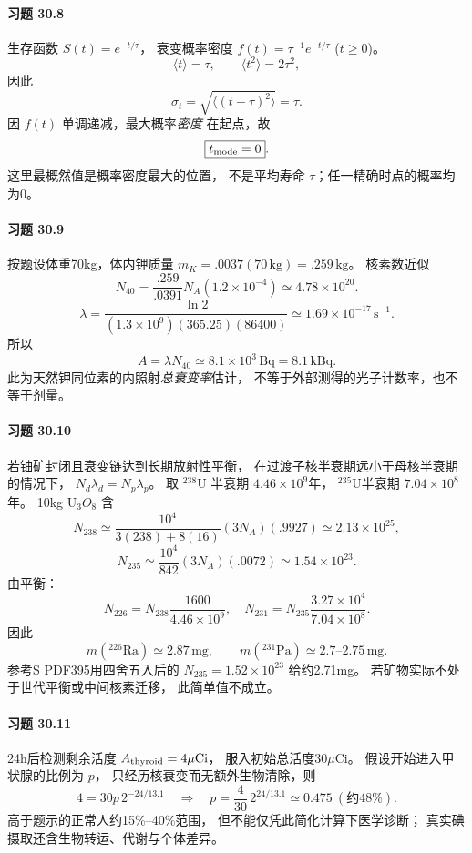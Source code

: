 \paragraph{习题 30.8}
生存函数 \(S(t)=e^{-t/\tau}\)，
衰变概率密度
\(f(t)=\tau^{-1}e^{-t/\tau}\) (\(t\ge0\))。
\[
\langle t\rangle=\tau,\qquad
\langle t^2\rangle=2\tau^2,
\]
因此
\[
\boxed{\sigma_t=\sqrt{\langle(t-\tau)^2\rangle}
=\tau}.
\]
因 \(f(t)\) 单调递减，最大概率\emph{密度}
在起点，故
\[
\boxed{t_{\rm mode}=0}.
\]
这里最概然值是概率密度最大的位置，
不是平均寿命 \(\tau\)；任一精确时点的概率均为0。

\paragraph{习题 30.9}
按题设体重70kg，体内钾质量
\(m_K=.0037(70\,\mathrm{kg})=.259\,\mathrm{kg}\)。
核素数近似
\[
N_{40}=\frac{.259}{.0391}N_A(1.2\times10^{-4})
\simeq4.78\times10^{20}.
\]
\[
\lambda=\frac{\ln2}{(1.3\times10^9)(365.25)(86400)}
\simeq1.69\times10^{-17}\,\mathrm{s^{-1}}.
\]
所以
\[
\boxed{A=\lambda N_{40}
\simeq8.1\times10^3\,\mathrm{Bq}=8.1\,\mathrm{kBq}}.
\]
此为天然钾同位素的内照射\emph{总衰变率}估计，
不等于外部测得的光子计数率，也不等于剂量。

\paragraph{习题 30.10}
若铀矿封闭且衰变链达到长期放射性平衡，
在过渡子核半衰期远小于母核半衰期的情况下，
\(N_d\lambda_d=N_p\lambda_p\)。
取 \({}^{238}\mathrm U\) 半衰期
\(4.46\times10^9\)年，
\({}^{235}\mathrm U\)半衰期
\(7.04\times10^8\)年。
10kg \(\mathrm U_3O_8\) 含
\[
N_{238}\simeq\frac{10^4}{3(238)+8(16)}
(3N_A)(.9927)\simeq2.13\times10^{25},
\]
\[
N_{235}\simeq\frac{10^4}{842}
(3N_A)(.0072)\simeq1.54\times10^{23}.
\]
由平衡：
\[
N_{226}=N_{238}\frac{1600}{4.46\times10^9},
\quad
N_{231}=N_{235}\frac{3.27\times10^4}{7.04\times10^8}.
\]
因此
\[
\boxed{m({}^{226}\mathrm{Ra})\simeq2.87\,\mathrm{mg}},\qquad
\boxed{m({}^{231}\mathrm{Pa})\simeq2.7\text{--}2.75\,\mathrm{mg}}.
\]
参考S PDF395用四舍五入后的
\(N_{235}=1.52\times10^{23}\) 给约2.71mg。
若矿物实际不处于世代平衡或中间核素迁移，
此简单值不成立。

\paragraph{习题 30.11}
24h后检测剩余活度 \(A_{\rm thyroid}=4\mu\mathrm{Ci}\)，
服入初始总活度30\(\mu\mathrm{Ci}\)。
假设开始进入甲状腺的比例为 \(p\)，
只经历核衰变而无额外生物清除，则
\[
4=30p\,2^{-24/13.1}
\quad\Longrightarrow\quad
\boxed{p=\frac4{30}\,2^{24/13.1}\simeq0.475
\ (\text{约48\%})}.
\]
高于题示的正常人约15\%--40\%范围，
但不能仅凭此简化计算下医学诊断；
真实碘摄取还含生物转运、代谢与个体差异。

